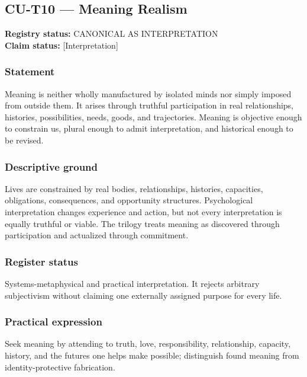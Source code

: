 \documentclass[
  11pt,
]{article}
\begin{document}
\subsection{CU-T10 --- Meaning Realism}\label{cu-t10-meaning-realism}

\textbf{Registry status:} CANONICAL AS INTERPRETATION\\
\textbf{Claim status:} {[}Interpretation{]}

\subsubsection{Statement}\label{statement-59}

Meaning is neither wholly manufactured by isolated minds nor simply
imposed from outside them. It arises through truthful participation in
real relationships, histories, possibilities, needs, goods, and
trajectories. Meaning is objective enough to constrain us, plural enough
to admit interpretation, and historical enough to be revised.

\subsubsection{Descriptive ground}\label{descriptive-ground-1}

Lives are constrained by real bodies, relationships, histories,
capacities, obligations, consequences, and opportunity structures.
Psychological interpretation changes experience and action, but not
every interpretation is equally truthful or viable. The trilogy treats
meaning as discovered through participation and actualized through
commitment.

\subsubsection{Register status}\label{register-status-1}

Systems-metaphysical and practical interpretation. It rejects arbitrary
subjectivism without claiming one externally assigned purpose for every
life.

\subsubsection{Practical expression}\label{practical-expression-1}

Seek meaning by attending to truth, love, responsibility, relationship,
capacity, history, and the futures one helps make possible; distinguish
found meaning from identity-protective fabrication.
\end{document}
